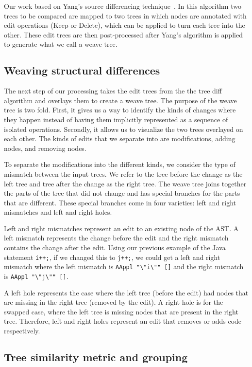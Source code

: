Our work based on Yang's source differencing technique~\cite{yang91diff}.
In this algorithm two trees to be compared are mapped to two trees in which
nodes are annotated with edit operations (Keep or Delete), which can be applied
to turn each tree into the other.  These edit trees are then post-processed
after Yang's algorithm is applied to generate what we call a weave tree.

\subsection{Weaving structural differences}

The next step of our processing takes the edit trees from the the tree diff
algorithm and overlays them to create a weave tree. The purpose of the weave
tree is two fold. First, it gives us a way to identify the kinds of changes
where they happen instead of having them implicitly represented as a sequence
of isolated operations. Secondly, it allows us to visualize the two trees
overlayed on each other. The kinds of edits that we separate into are
modifications, adding nodes, and removing nodes.

To separate the modifications into the different kinds, we consider the type of
mismatch between the input trees. We refer to the tree before the change as the
left tree and tree after the change as the right tree. The weave tree joins
together the parts of the tree that did not change and has special branches for
the parts that are different. These special branches come in four varieties:
left and right mismatches and left and right holes.

Left and right mismatches represent an edit to an existing node of the AST\@.
A left mismatch represents the change before the edit and the right mismatch
contains the change after the edit.  Using our previous example of the Java
statement {\tt i++;}, if we changed this to {\tt j++;}, we could get a left
and right mismatch where the left mismatch is {\tt AAppl
"\textbackslash"i\textbackslash"" []} and the right mismatch is {\tt AAppl
"\textbackslash"j\textbackslash"" []}. 

A left hole represents the case where the left tree (before the edit) had nodes
that are missing in the right tree (removed by the edit). A right hole is for
the swapped case, where the left tree is missing nodes that are present in the
right tree. Therefore, left and right holes represent an edit that removes or
adds code respectively.

\subsection{Tree similarity metric and grouping}

